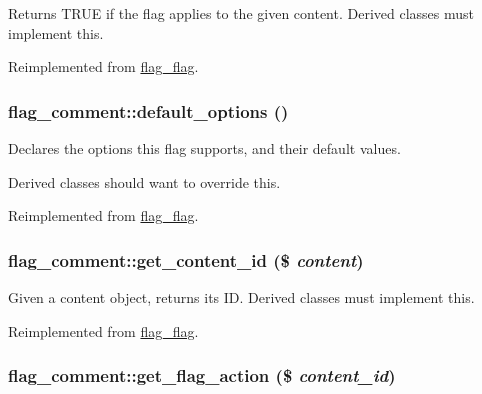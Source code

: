 Returns TRUE if the flag applies to the given content. Derived classes must implement this.

Reimplemented from \hyperlink{classflag__flag_55c4da8291aed979309f25ce09953092}{flag\_\-flag}.\hypertarget{classflag__comment_022d24a6bb4afca5563c69e0ab50007f}{
\subsubsection[{default\_\-options}]{\setlength{\rightskip}{0pt plus 5cm}flag\_\-comment::default\_\-options ()}}
\label{classflag__comment_022d24a6bb4afca5563c69e0ab50007f}


Declares the options this flag supports, and their default values.

Derived classes should want to override this. 

Reimplemented from \hyperlink{classflag__flag_240678d55d61a16ef848ecc0cc3c609f}{flag\_\-flag}.\hypertarget{classflag__comment_69760ed8615fd076652d702a03c261aa}{
\subsubsection[{get\_\-content\_\-id}]{\setlength{\rightskip}{0pt plus 5cm}flag\_\-comment::get\_\-content\_\-id (\$ {\em content})}}
\label{classflag__comment_69760ed8615fd076652d702a03c261aa}


Given a content object, returns its ID. Derived classes must implement this.

Reimplemented from \hyperlink{classflag__flag_4da5889b258c2bc28b248678573b881a}{flag\_\-flag}.\hypertarget{classflag__comment_9f4e0def33514ead29271f9628902d5c}{
\subsubsection[{get\_\-flag\_\-action}]{\setlength{\rightskip}{0pt plus 5cm}flag\_\-comment::get\_\-flag\_\-action (\$ {\em content\_\-id})}}
\label{classflag__comment_9f4e0def33514ead29271f9628902d5c}


